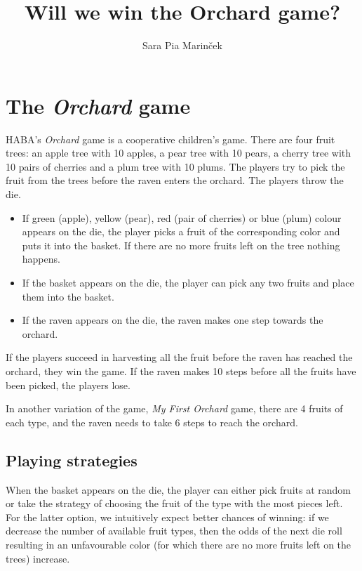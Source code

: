 \documentclass{article}
\begin{document}


\title{Will we win the Orchard game?}
\author{Sara Pia Marinček}
\date{}

\maketitle

\section{The \emph{Orchard} game}
HABA's \emph{Orchard} game is a cooperative children's game. There are four fruit trees: an apple tree with 10 apples, a pear tree with 10 pears, a cherry tree with 10 pairs of cherries and a plum tree with 10 plums. The players try to pick the fruit from the trees before the raven enters the orchard. The players throw the die.
\begin{itemize}
\item If green (apple), yellow (pear), red (pair of cherries) or blue (plum) colour appears on the die, the player picks a fruit of the corresponding color and puts it into the basket. If there are no more fruits left on the tree nothing happens.
\item If the basket appears on the die, the player can pick any two fruits and place them into the basket.
\item If the raven appears on the die, the raven makes one step towards the orchard.
\end{itemize}
If the players succeed in harvesting all the fruit before the raven has reached the orchard, they win the game. If the raven makes 10 steps before all the fruits have been picked, the players lose.

In another variation of the game, \emph{My First Orchard} game, there are 4 fruits of each type, and the raven needs to take 6 steps to reach the orchard.

\subsection{Playing strategies}
When the basket appears on the die, the player can either pick fruits at random or take the strategy of choosing the fruit of the type with the most pieces left. For the latter option, we intuitively expect better chances of winning: if we decrease the number of available fruit types, then the odds of the next die roll resulting in an unfavourable color (for which there are no more fruits left on the trees) increase.
\end{document}
